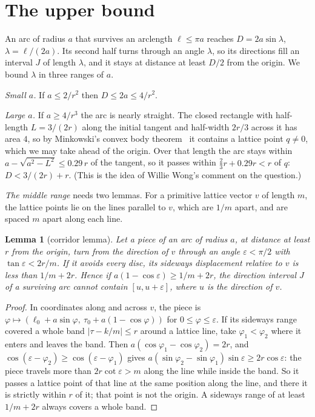 \documentclass[11pt]{article}
\newtheorem{lemma}[theorem]{Lemma}
\begin{document}
\section{The upper bound}

An arc of radius $a$ that survives an arclength $\ell\le\pi a$ reaches $D=2a\sin\lambda$, $\lambda=\ell/(2a)$. Its
second half turns through an angle $\lambda$, so its directions fill an interval $J$ of length $\lambda$, and it stays
at distance at least $D/2$ from the origin. We bound $\lambda$ in three ranges of $a$.

\emph{Small $a$.} If $a\le2/r^2$ then $D\le2a\le4/r^2$.

\emph{Large $a$.} If $a\ge4/r^3$ the arc is nearly straight. The closed rectangle with half-length $L=3/(2r)$ along
the initial tangent and half-width $2r/3$ across it has area $4$, so by Minkowski's convex body theorem~\cite[Ch.~III]{Cassels}
it contains a lattice point $q\ne0$, which we may take ahead of the origin. Over that length the arc stays within
$a-\sqrt{a^2-L^2}\le0.29\,r$ of the tangent, so it passes within $\frac23r+0.29r<r$ of $q$: $D<3/(2r)+r$. (This is the
idea of Willie Wong's comment on the question.)

\emph{The middle range} needs two lemmas. For a primitive lattice vector $v$ of length $m$, the lattice points lie on
the lines parallel to $v$, which are $1/m$ apart, and are spaced $m$ apart along each line.

\begin{lemma}[corridor lemma]\label{lem:corridor}
Let a piece of an arc of radius $a$, at distance at least $r$ from the origin, turn from the direction of $v$ through an
angle $\varepsilon<\pi/2$ with $\tan\varepsilon<2r/m$. If it avoids every disc, its sideways displacement relative to
$v$ is less than $1/m+2r$. Hence if $a(1-\cos\varepsilon)\ge1/m+2r$, the direction interval $J$ of a surviving arc
cannot contain $[u,u+\varepsilon]$, where $u$ is the direction of $v$.
\end{lemma}

\begin{proof}
In coordinates along and across $v$, the piece is $\varphi\mapsto(\ell_0+a\sin\varphi,\ \tau_0+a(1-\cos\varphi))$ for
$0\le\varphi\le\varepsilon$. If its sideways range covered a whole band $|\tau-k/m|\le r$ around a lattice line,
take $\varphi_1<\varphi_2$ where it enters and leaves the band. Then $a(\cos\varphi_1-\cos\varphi_2)=2r$, and
$\cos(\varepsilon-\varphi_2)\ge\cos(\varepsilon-\varphi_1)$ gives
$a(\sin\varphi_2-\sin\varphi_1)\sin\varepsilon\ge2r\cos\varepsilon$: the piece travels more than $2r\cot\varepsilon>m$
along the line while inside the band. So it passes a lattice point of that line at the same position along the line,
and there it is strictly within $r$ of it; that point is not the origin. A sideways range of at least $1/m+2r$ always
covers a whole band.
\end{proof}
\end{document}
